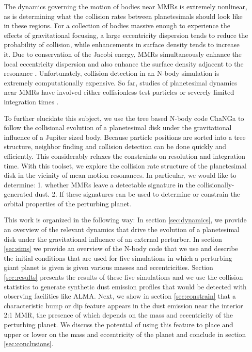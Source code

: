 \documentclass[twocolumn]{aastex63}
\begin{document}
The dynamics governing the motion of bodies near MMRs is extremely nonlinear, as is determining what the collision rates between planetesimals 
should look like in these regions. For a collection of bodies massive enough to experience the effects of gravitational focusing, a large eccentricity 
dispersion tends to reduce the probability of collision, while enhancements in surface density tends to increase it. Due to conservation of the Jacobi 
energy, MMRs simultaneously enhance the local eccentricity dispersion and also enhance the surface density adjacent to the resonance 
\citep{2000Icar..143...45R, 2017ApJ...850..103B}. Unfortunately, collision detection in an N-body simulation is extremely computationally expensive. 
So far, studies of planetesimal dynamics near MMRs have involved either collisionless test particles 
\citep{2017ApJ...850..103B, 2016ApJ...818..159T, 2018ApJ...857....3T} or severely limited integration times \citep{2000Icar..143...45R}.

To further elucidate this subject, we use the tree based N-body code {\sc ChaNGa}
\citep{2008IEEEpds...ChaNGa, 2015AphCom..2..1} to follow the collisional evolution of a planetesimal disk under the gravitational 
influence of a Jupiter sized body. Because particle positions are sorted into a tree structure, neighbor finding and collision detection 
can be done quickly and efficiently. This considerably relaxes the constraints on resolution and integration time. With this toolset, we 
explore the collision rate structure of the planetesimal disk in the vicinity of mean motion resonances. In particular, we would like to 
determine: 1. whether MMRs leave a detectable signature in the collisionally-generated dust. 2. If these signatures can be used to determine or 
constrain the orbital properties of the perturbing planet.

This work is organized in the following way: In section \ref{sec:dynamics}, we provide an overview of the relevant dynamics that drive the evolution 
of a planetesimal disk under the gravitational influence of an external perturber. In section \ref{sec:sims} we provide an overview of the N-body code 
that we use and describe the initial conditions that are used for five simulations in which a perturbing giant planet is given is given various masses 
and eccentricities. Section \ref{sec:results} presents the results of these five simulations and we use the collision statistics to generate synthetic dust 
emission profiles that would be detected with observing facilities like ALMA. Next, we show in section \ref{sec:constrain} that a characteristic bump 
or dip feature appears in the dust emission near the interior 2:1 MMR, the presence of which depends on the mass and eccentricity of the perturbing 
planet. We discuss the potential of using this feature to place and upper or lower on the mass and eccentricity of the planet and conclude in section 
\ref{sec:conclusions}.
\end{document}
